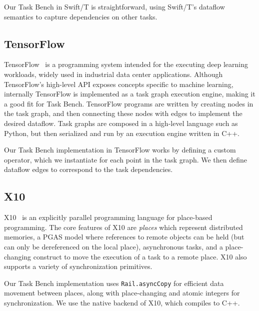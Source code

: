 Our Task Bench in Swift/T is straightforward, using Swift/T's dataflow
semantics to capture dependencies on other tasks.

\subsection{TensorFlow}

TensorFlow~\cite{TensorFlow15} is a programming system intended for
the executing deep learning workloads, widely used in industrial data
center applications. Although TensorFlow's high-level API exposes
concepts specific to machine learning, internally TensorFlow is
implemented as a task graph execution engine, making it a good fit for
Task Bench. TensorFlow programs are written by creating nodes in the
task graph, and then connecting these nodes with edges to implement
the desired dataflow. Task graphs are composed in a high-level
language such as Python, but then serialized and run by an
execution engine written in C++.

Our Task Bench implementation in TensorFlow works by defining a custom
operator, which we instantiate for each point in the task graph. We
then define dataflow edges to correspond to the task dependencies.

\subsection{X10}

X10~\cite{X1005} is an explicitly parallel programming language for
place-based programming. The core features of X10 are \emph{places}
which represent distributed memories, a PGAS model where references to
remote objects can be held (but can only be dereferenced on the local
place), asynchronous tasks, and a place-changing construct to move the
execution of a task to a remote place. X10 also supports a variety of
synchronization primitives.

Our Task Bench implementation uses
\lstinline[language=X10]{Rail.asyncCopy} for efficient data movement
between places, along with place-changing and atomic integers for
synchronization. We use the native backend of X10, which compiles to
C++.

